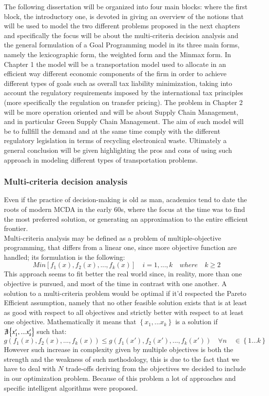 \begin{doublespace}
The following dissertation will be organized into four main blocks: where the first block, the introductory one, is devoted in giving an overview of the notions that will be used to model the two different problems proposed in the next chapters and specifically the focus will be about the multi-criteria decision analysis and the general formulation of a Goal Programming model in its three main forms, namely the lexicographic form, the weighted form and the Minmax form. In Chapter 1 the model will be a transportation model used to allocate in an efficient way different economic components of the firm in order to achieve different types of goals such as overall tax liability minimization, taking into account the regulatory requirements imposed by the international tax principles (more specifically the regulation on transfer pricing). The problem in Chapter 2 will be more operation oriented and will be about Supply Chain Management, and in particular Green Supply Chain Management. The aim of such model will be to fullfill the demand and at the same time comply with the different regulatory legislation in terms of recycling electronical waste. Ultimately a general conclusion will be given highlighting the pros and cons of using such approach in modeling different types of transportation problems.

\subsubsection{Multi-criteria decision analysis}
Even if the practice of decision-making is old as man, academics tend to date the roots of modern MCDA in the early 60s, where the focus at the time was to find the most preferred solution, or generating an approximation to the entire efficient frontier\cite{Greco2016}.
\\
Multi-criteria analysis may be defined as a problem of multiple-objective programming, that differs from a linear one,
since more objective function are handled; its formulation is the following:
	$$
	Min[f_1(x),f_2(x),...,f_k(x)] \quad i=1,...,k \quad where \quad k\geq2
	$$
This approach seems to fit better the real world since, in reality, more than one objective is pursued, and most of the time in contrast with one another.
A solution to a multi-criteria problem would be optimal if it'd respected the Pareto Efficient assumption, namely that no other feasible solution exists that is at least as good with respect to all objectives and strictly better with respect to at least one objective. Mathematically it means that $\left\{x_1,...x_k\right\}$ is a solution if $\not\exists \left\{x'_1,...x'_k\right\}$
such that:
	\[
	g(f_1(x),f_2(x),...,f_k(x)) \leq g(f_1(x'),f_2(x'),...,f_k(x')) \quad \forall n \quad \in  \left\{1...k\right\}
	\]
However such increase in complexity given by multiple objectives is both the strength and the weakness of such methodology, this is due to the fact that we have to deal with $N$ trade-offs deriving from the objectives we decided to include in our optimization problem. Because of this problem a lot of approaches and specific intelligent algorithms were proposed\cite{Cui2017}.


\end{doublespace}
